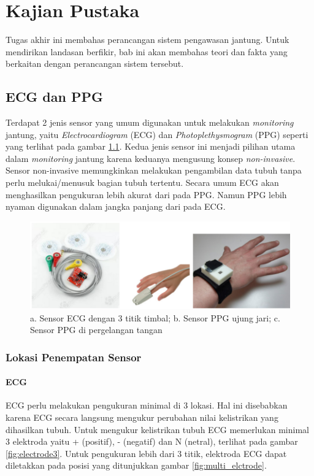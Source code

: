 \chapter{Kajian Pustaka}
Tugas akhir ini membahas perancangan sistem pengawasan jantung. Untuk mendirikan landasan berfikir, bab ini akan membahas teori dan fakta yang berkaitan dengan perancangan sistem tersebut.

\section{ECG dan PPG}
Terdapat 2 jenis sensor yang umum digunakan untuk melakukan \textit{monitoring} jantung, yaitu \textit{Electrocardiogram} (ECG) dan \textit{Photoplethysmogram} (PPG) seperti yang terlihat pada gambar \ref{fig:ecg_n_ppg}. Kedua jenis sensor ini menjadi pilihan utama dalam \textit{monitoring} jantung karena keduanya mengusung konsep \textit{non-invasive}. Sensor non-invasive memungkinkan melakukan pengambilan data tubuh tanpa perlu melukai/menusuk bagian tubuh tertentu. Secara umum ECG akan menghasilkan pengukuran lebih akurat dari pada PPG. Namun PPG lebih nyaman digunakan dalam jangka panjang dari pada ECG.

\begin{figure}[H]
    \centering
    \includegraphics[scale=0.3]{images/sensors.png}
    \caption{a. Sensor ECG dengan 3 titik timbal; b. Sensor PPG ujung jari; c. Sensor PPG di pergelangan tangan}
    \label{fig:ecg_n_ppg}
\end{figure}

\subsection{Lokasi Penempatan Sensor}
\subsubsection{ECG}
ECG perlu melakukan pengukuran minimal di 3 lokasi. Hal ini disebabkan karena ECG secara langsung mengukur perubahan nilai kelistrikan yang dihasilkan tubuh. Untuk mengukur kelistrikan tubuh ECG memerlukan minimal 3 elektroda yaitu + (positif), - (negatif) dan N (netral), terlihat pada gambar \ref{fig:electrode3}. Untuk pengukuran lebih dari 3 titik, elektroda ECG dapat diletakkan pada posisi yang ditunjukkan gambar \ref{fig:multi_elctrode}.

